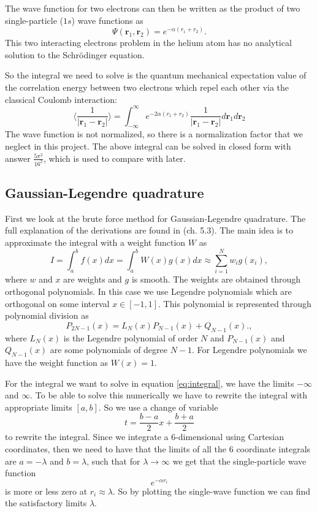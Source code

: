 \documentclass[12pt,a4paper,english]{article}
\begin{document}
The wave function for two electrons can then be written as the product of two single-particle ($1s$) wave functions as
\begin{equation}
\label{eq:wave_2}
\Psi(\textbf{r}_1, \textbf{r}_2)=e^{-\alpha(r_1+r_2)}.
\end{equation}
This two interacting electrons problem in the helium atom has no analytical solution to the Schrödinger equation. 

So the integral we need to solve is the quantum mechanical expectation value of the correlation energy between two electrons which repel each other via the classical Coulomb interaction:
\begin{equation}
\label{eq:integral}
\langle\frac{1}{|\textbf{r}_1-\textbf{r}_2|}\rangle=\int_{-\infty}^{\infty}e^{-2\alpha(r_1+r_2)}\frac{1}{|\textbf{r}_1-\textbf{r}_2|}d\textbf{r}_1d\textbf{r}_2
\end{equation}
The wave function is not normalized, so there is a normalization factor that we neglect in this project. The above integral can be solved in closed form with answer $\frac{5\pi^2}{16^2}$, which is used to compare with later.

\subsection{Gaussian-Legendre quadrature}
First we look at the brute force method for Gaussian-Legendre quadrature. The full explanation of the derivations are found in \citet{lectures} (ch. 5.3). The main idea is to approximate the integral with a weight function $W$ as 
\begin{equation}
\label{eq:Gaussian_int}
I=\int_{a}^{b}f(x)dx=\int_{a}^{b}W(x)g(x)dx\approx\sum_{i=1}^{N}w_ig(x_i),
\end{equation}
where $w$ and $x$ are weights and $g$ is smooth. The weights are obtained through orthogonal polynomials. In this case we use Legendre polynomials which are orthogonal on some interval $x\in[-1,1]$. This polynomial is represented through polynomial division as 
\[P_{2N-1}(x)=L_N(x)P_{N-1}(x)+Q_{N-1}(x).,\]
where $L_N(x)$ is the Legendre polynomial of order $N$ and $P_{N-1}(x)$ and $Q_{N-1}(x)$ are some polynomials of degree $N-1$.
For Legendre polynomials we have the weight function as $W(x)=1$. 

For the integral we want to solve in equation \ref{eq:integral}, we have the limits $-\infty$ and $\infty$. To be able to solve this numerically we have to rewrite the integral with appropriate limits $[a,b]$. So we use a change of variable \[t=\frac{b-a}{2}x+\frac{b+a}{2}\] to rewrite the integral. Since we integrate a 6-dimensional using Cartesian coordinates, then we need to have that the limits of all the 6 coordinate integrals are $a=-\lambda$ and $b=\lambda$, such that for $\lambda\rightarrow\infty$ we get that the single-particle wave function 
\begin{equation}
\label{eq:single_wave}
e^{-\alpha r_i}
\end{equation}
is more or less zero at $r_i\approx\lambda$. So by plotting the single-wave function we can find the satisfactory limits $\lambda$.
\end{document}
